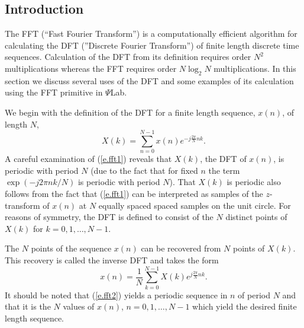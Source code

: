 \subsection{Introduction}

	The FFT (``Fast Fourier Transform'') is a computationally 
efficient algorithm for calculating the DFT (''Discrete Fourier Transform'')
of finite length discrete time sequences.
  Calculation of the DFT from its definition
requires order $N^2$ multiplications whereas the FFT requires
order $N\log_2N$ multiplications.
In this section we discuss several uses of the DFT and some examples
of its calculation using the FFT primitive in $\Psi$Lab.

	We begin with the definition of the DFT
for a finite length sequence, $x(n)$, of length $N$,
%
\begin{equation}
X(k)=\sum_{n=0}^{N-1}x(n)e^{-j\frac{2\pi}{N}nk}.
\label{e.fft1}
\end{equation}
%
A careful examination of (\ref{e.fft1}) reveals that
$X(k)$, the DFT of $x(n)$, is periodic with period $N$ (due to the fact
that for fixed $n$ the term $\exp(-j2\pi nk/N)$ is periodic
with period $N$).  That $X(k)$ is periodic
also follows from the fact that (\ref{e.fft1}) can be interpreted
as samples of the $z$-transform of $x(n)$ at $N$ equally spaced
spaced samples on the unit circle.
For reasons of symmetry, the DFT is defined to consist of the $N$
distinct points of $X(k)$ for $k=0,1,\ldots,N-1$.

	The $N$ points of the sequence $x(n)$ can be recovered from
$N$ points of $X(k)$.  This recovery is called the inverse
DFT and takes the form
%
\begin{equation}
x(n)=\frac{1}{N}\sum_{k=0}^{N-1}X(k)e^{j\frac{2\pi}{N}nk}.
\label{e.fft2}
\end{equation}
%
It should be noted that (\ref{e.fft2}) yields a periodic sequence in $n$ 
of period $N$ and that it is the $N$
values of $x(n)$, $n=0,1,\ldots,N-1$ which yield
the desired finite length sequence.


